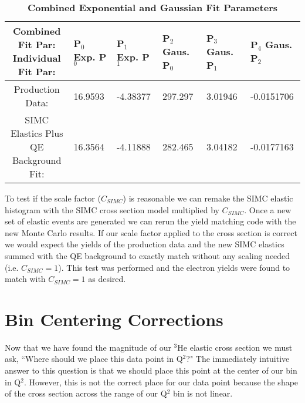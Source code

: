 \begin{table}[!h]
\centering
\begin{tabular}{|c | l l l l l|}
\hline
\makecell{\textbf{Combined Fit Par:}\\ \textbf{Individual Fit Par:}} & \makecell{\textbf{P$_0$}\\ \textbf{Exp. P$_0$}} & \makecell{\textbf{P$_1$}\\ \textbf{Exp. P$_1$}} & \makecell{\textbf{P$_2$}\\ \textbf{Gaus. P$_0$}} & \makecell{\textbf{P$_3$}\\ \textbf{Gaus. P$_1$}} & \makecell{\textbf{P$_4$}\\ \textbf{Gaus. P$_2$}}\\
\hline
Production Data: & 16.9593 & -4.38377 & 297.297 & 3.01946 & -0.0151706 \\ 
\makecell{SIMC Elastics Plus\\ QE Background Fit}: & 16.3564 & -4.11888 & 282.465 & 3.04182 & -0.0177163 \\ 
\hline
\end{tabular}
\caption{{\bf{Combined Exponential and Gaussian Fit Parameters}} }
\label{tab:peak_pars}
\end{table}

To test if the scale factor ($C_{SIMC}$) is reasonable we can remake the SIMC elastic histogram with the SIMC cross section model multiplied by $C_{SIMC}$. Once a new set of elastic events are generated we can rerun the yield matching code with the new Monte Carlo results. If our scale factor applied to the cross section is correct we would expect the yields of the production data and the new SIMC elastics summed with the QE background to exactly match without any scaling needed (i.e. $C_{SIMC}=1$). This test was performed and the electron yields were found to match with $C_{SIMC}=1$ as desired.

\section{Bin Centering Corrections}
\label{sec:bin_cor}

Now that we have found the magnitude of our $^3$He elastic cross section we must ask, ``Where should we place this data point in Q$^2$?" The immediately intuitive answer to this question is that we should place this point at the center of our bin in Q$^2$. However, this is not the correct place for our data point because the shape of the cross section across the range of our Q$^2$ bin is not linear.
 
